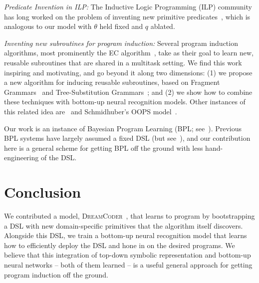 \documentclass{article}
\newcommand{\system}{\textsc{DreamCoder}~}
\begin{document}
 \noindent \emph{Predicate Invention in ILP:} The Inductive Logic Programming (ILP) community
 has long worked on the problem of inventing new primitive predicates~\cite{DBLP:conf/ecai/LinDETM14,muggleton2015meta}, which is analogous to our model with $\theta$ held fixed and $q$ ablated.

 \noindent \emph{Inventing new subroutines for program induction:}
 Several program induction algorithms, most prominently the EC algorithm~\cite{Dechter:2013:BLV:2540128.2540316}, take as their goal to learn new, reusable subroutines that are shared in a multitask setting. We find this work inspiring and motivating,
 and go beyond it along two dimensions: (1) we propose a new algorithm for
 inducing reusable subroutines, based on Fragment Grammars~\cite{tim} and Tree-Substitution Grammars~\cite{cohn2010inducing};
 and (2) we show how to combine these techniques with bottom-up neural recognition models.
 Other instances of this related idea are~\cite{DBLP:conf/icml/LiangJK10} and Schmidhuber's OOPS model~\cite{schmidhuber2004optimal}.
 
 Our work is an instance of
 Bayesian Program
 Learning (BPL; see~\citep{lake2013one,Dechter:2013:BLV:2540128.2540316,ellis2016sampling,DBLP:conf/icml/LiangJK10}). Previous BPL systems have largely assumed a fixed DSL (but see~\cite{DBLP:conf/icml/LiangJK10}),
 and our contribution here is a general scheme for getting BPL off the ground with less hand-engineering of the DSL.
 
 \section{Conclusion}
 We contributed a model, \system, that learns to program by
 bootstrapping a DSL with new domain-specific primitives that the algorithm itself discovers.
  Alongside this DSL, we train a bottom-up
 neural recognition model that learns how to efficiently deploy the
 DSL and hone in on the desired programs.  We believe that this
 integration of top-down symbolic representation and bottom-up neural
 networks -- both of them learned -- is a useful general approach for
 getting program induction off the ground. 
  

\pagebreak





\end{document}
